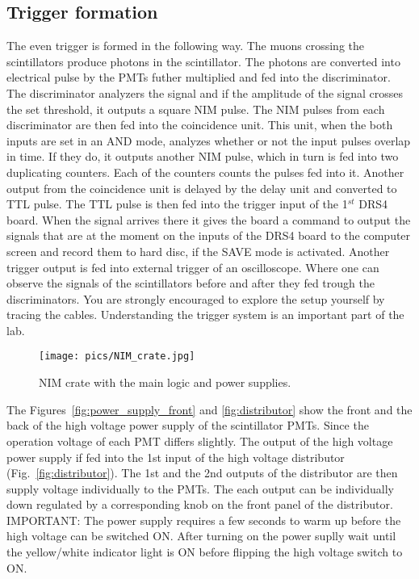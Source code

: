 \documentclass[12pt]{article}
\begin{document}
\subsection{Trigger formation}
The even trigger is formed in the following way. The muons crossing the scintillators produce photons in the scintillator. The photons are converted into electrical pulse by the PMTs futher multiplied and fed into the discriminator. The discriminator analyzers the signal and if the amplitude of the signal crosses the set threshold, it outputs a square NIM pulse. The NIM pulses from each discriminator are then fed into the coincidence unit. This unit, when the both inputs are set in an AND mode, analyzes whether or not the input pulses overlap in time. If they do, it outputs another NIM pulse, which in turn is fed into two duplicating counters. Each of the counters counts the pulses fed into it. Another output from the coincidence unit is delayed by the delay unit and converted to TTL pulse. The TTL pulse is then fed into the trigger input of the 1$^{st}$ DRS4 board. When the signal arrives there it gives the board a command to output the signals that are at the moment on the inputs of the DRS4 board to the computer screen and record them to hard disc, if the SAVE mode is activated. Another trigger output is fed into external trigger of an oscilloscope. Where one can observe the signals of the scintillators before and after they fed trough the discriminators. You are strongly encouraged to explore the setup yourself by tracing the cables. Understanding the trigger system is an important part of the lab. 

\begin{figure}[!h]
\texttt{[image: pics/NIM\_crate.jpg]}
\centering
\caption{NIM crate with the main logic and power supplies.}
\label{fig:NIM_crate}
\end{figure}

The Figures~\ref{fig:power_supply_front} and \ref{fig:distributor} show the front and the back of the high voltage power supply of the scintillator PMTs. Since the operation voltage of each PMT differs slightly. The output of the high voltage power supply if fed into the 1st input of the high voltage distributor (Fig.~\ref{fig:distributor}). The 1st and the 2nd outputs of the distributor are then supply voltage individually to the PMTs. The each output can be individually down regulated by a corresponding knob on the front panel of the distributor. IMPORTANT: The power supply requires a few seconds to warm up before the high voltage can be switched ON. After turning on the power suplly wait until the yellow/white indicator light is ON before flipping the high voltage switch to ON.
\end{document}
